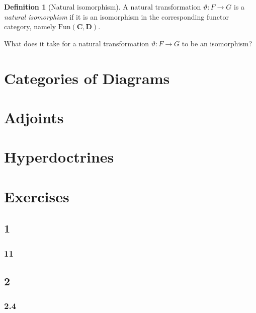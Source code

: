 \documentclass{book}
\theoremstyle{definition}
\newtheorem{definition}{Definition}[section]
\newcommand\Fun{\text{Fun}}
\begin{document}
\begin{definition}[Natural isomorphism]
  A natural transformation $\vartheta : F \to G$ is a \emph{natural isomorphism}
  if it is an isomorphism in the corresponding functor category, namely
  $\Fun(\mathbf{C}, \mathbf{D})$.
\end{definition}

What does it take for a natural transformation $\vartheta : F \to G$ to be an
isomorphism?

\chapter{Categories of Diagrams}

\chapter{Adjoints}

\chapter{Hyperdoctrines}

\chapter{Exercises}

\section{1}

\subsection{11}

\section{2}

\subsection{2.4}
\end{document}
